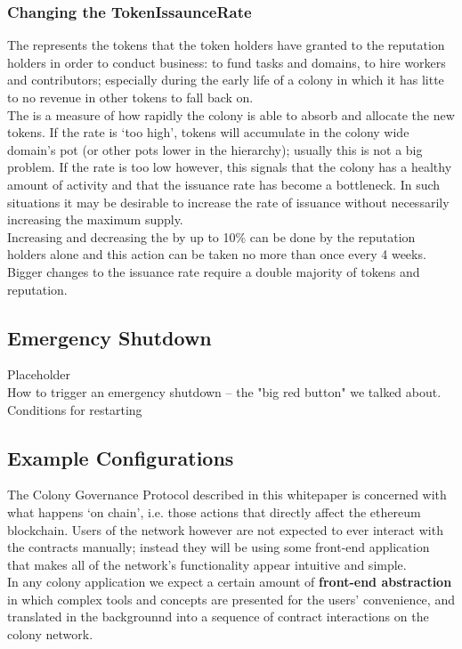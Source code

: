 \subsubsection{Changing the TokenIssaunceRate}
The  represents the tokens that the token holders have granted to the reputation holders in order to conduct business: to fund tasks and domains, to hire workers and contributors; especially during the early life of a colony in which it has litte to no revenue in other tokens to fall back on.\\
The  is a measure of how rapidly the colony is able to absorb and allocate the new tokens. If the rate is `too high', tokens will accumulate in the colony wide domain's pot (or other pots lower in the hierarchy); usually this is not a big problem. If the rate is too low however, this signals that the colony has a healthy amount of activity and that the issuance rate has become a bottleneck. In such situations it may be desirable to increase the rate of issuance without necessarily increasing the maximum supply. \\
Increasing and decreasing the  by up to 10\% can be done by the reputation holders alone and this action can be taken no more than once every 4 weeks. Bigger changes to the issuance rate require a double majority of tokens and reputation.

\subsection{Emergency Shutdown}
%
Placeholder\\
How to trigger an emergency shutdown -- the "big red button" we talked about.
Conditions for restarting
%

\subsection{Example Configurations}\label{sec:example-configs}
The Colony Governance Protocol described in this whitepaper is concerned with what happens `on chain', i.e. those actions that directly affect the ethereum blockchain. Users of the network however are not expected to ever interact with the contracts manually; instead they will be using some front-end application that makes all of the network's functionality appear intuitive and simple.\\
In any colony application we expect a certain amount of \textbf{front-end abstraction} in which complex tools and concepts are presented for the users' convenience, and translated in the backgrounnd into a sequence of contract interactions on the colony network.

